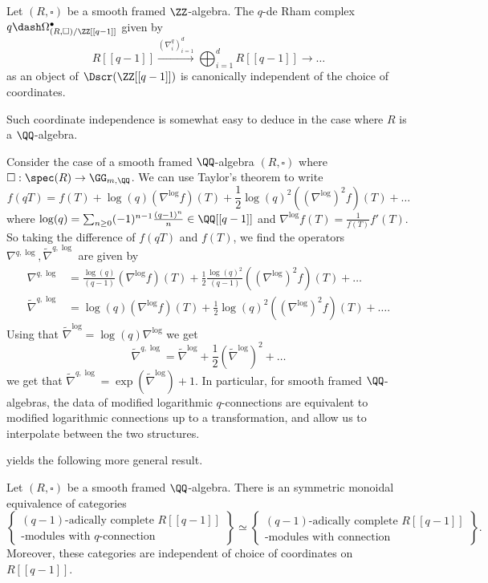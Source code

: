 \begin{theorem}
    Let $(R,\square)$ be a smooth framed $\ZZ$-algebra. The $q$-de Rham complex $q\dash\Omega_{(R,\square)/\ZZ[[q-1]]}^{\bullet}$ given by 
    $$R[[q-1]]\xrightarrow{(\nabla_{i}^{q})_{i=1}^{d}}\bigoplus_{i=1}^{d}R[[q-1]]\longrightarrow\dots$$
    as an object of $\Dscr(\ZZ[[q-1]])$ is canonically independent of the choice of coordinates. 
\end{theorem}
Such coordinate independence is somewhat easy to deduce in the case where $R$ is a $\QQ$-algebra. 
\begin{example}\label{ex: translation between connections and q-connections}
    Consider the case of a smooth framed $\QQ$-algebra $(R,\square)$ where $\square:\spec(R)\to\GG_{m,\QQ}$. We can use Taylor's theorem to write 
    $$f(qT)=f(T)+\log(q)(\nabla^{\log}f)(T)+\frac{1}{2}\log(q)^{2}((\nabla^{\log})^{2}f)(T)+\dots$$
    where $\log(q)=\sum_{n\geq0}(-1)^{n-1}\frac{(q-1)^{n}}{n}\in\QQ[[q-1]]$ and $\nabla^{\log}f(T)=\frac{1}{f(T)}f'(T)$. So taking the difference of $f(qT)$ and $f(T)$, we find the operators $\nabla^{q,\log},\widetilde{\nabla}^{q,\log}$ are given by 
    \begin{align*}
        \nabla^{q,\log} &= \frac{\log(q)}{(q-1)}(\nabla^{\log}f)(T)+\frac{1}{2}\frac{\log(q)^{2}}{(q-1)}((\nabla^{\log})^{2}f)(T)+\dots\\
        \widetilde{\nabla}^{q,\log} &= \log(q)(\nabla^{\log}f)(T)+\frac{1}{2}\log(q)^{2}((\nabla^{\log})^{2}f)(T)+\dots.
    \end{align*}
    Using that $\widetilde{\nabla}^{\log}=\log(q)\nabla^{\log}$ we get 
    $$\widetilde{\nabla}^{q,\log}=\widetilde{\nabla}^{\log}+\frac{1}{2}(\widetilde{\nabla}^{\log})^{2}+\dots$$
    we get that $\widetilde{\nabla}^{q,\log}=\exp(\widetilde{\nabla}^{\log})+1$. In particular, for smooth framed $\QQ$-algebras, the data of modified logarithmic $q$-connections are equivalent to modified logarithmic connections up to a transformation, and allow us to interpolate between the two structures. 
\end{example}
 yields the following more general result. 
\begin{proposition}\label{prop: R-modules with ordinary connection}
    Let $(R,\square)$ be a smooth framed $\QQ$-algebra. There is an symmetric monoidal equivalence of categories 
    $$\left\{\substack{(q-1)\text{-adically complete }R[[q-1]] \\ \text{-modules with }q\text{-connection}}\right\}\simeq\left\{\substack{(q-1)\text{-adically complete }R[[q-1]] \\ \text{-modules with connection}}\right\}.$$
    Moreover, these categories are independent of choice of coordinates on $R[[q-1]]$. 
\end{proposition}
